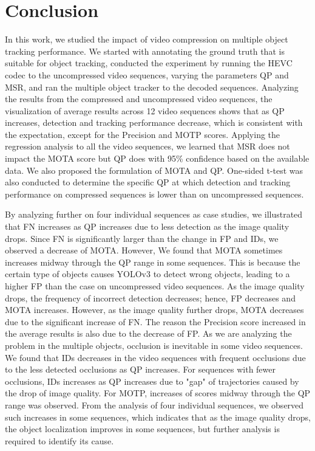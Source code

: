 \chapter{Conclusion}
\label{chap:conclusion}

In this work, we studied the impact of video compression on multiple object tracking performance. We started with annotating the ground truth that is suitable for object tracking, conducted the experiment by running the HEVC codec to the uncompressed video sequences, varying the parameters QP and MSR, and ran the multiple object tracker to the decoded sequences. Analyzing the results from the compressed and uncompressed video sequences, the visualization of average results across 12 video sequences shows that as QP increases, detection and tracking performance decrease, which is consistent with the expectation, except for the Precision and MOTP scores. Applying the regression analysis to all the video sequences, we learned that MSR does not impact the MOTA score but QP does with 95\% confidence based on the available data. We also proposed the formulation of MOTA and QP. One-sided t-test was also conducted to determine the specific QP at which detection and tracking performance on compressed sequences is lower than on uncompressed sequences. 

By analyzing further on four individual sequences as case studies, we illustrated that FN increases as QP increases due to less detection as the image quality drops. Since FN is significantly larger than the change in FP and IDs, we observed a decrease of MOTA. However, We found that MOTA sometimes increases midway through the QP range in some sequences. This is because the certain type of objects causes YOLOv3 to detect wrong objects, leading to a higher FP than the case on uncompressed video sequences. As the image quality drops, the frequency of incorrect detection decreases; hence, FP decreases and MOTA increases. However, as the image quality further drops, MOTA decreases due to the significant increase of FN. The reason the Precision score increased in the average results is also due to the decrease of FP. As we are analyzing the problem in the multiple objects, occlusion is inevitable in some video sequences. We found that IDs decreases in the video sequences with frequent occlusions due to the less detected occlusions as QP increases. For sequences with fewer occlusions, IDs increases as QP increases due to "gap" of trajectories caused by the drop of image quality. For MOTP, increases of scores midway through the QP range was observed. From the analysis of four individual sequences, we observed such increases in some sequences, which indicates that as the image quality drops, the object localization improves in some sequences, but further analysis is required to identify its cause. 

